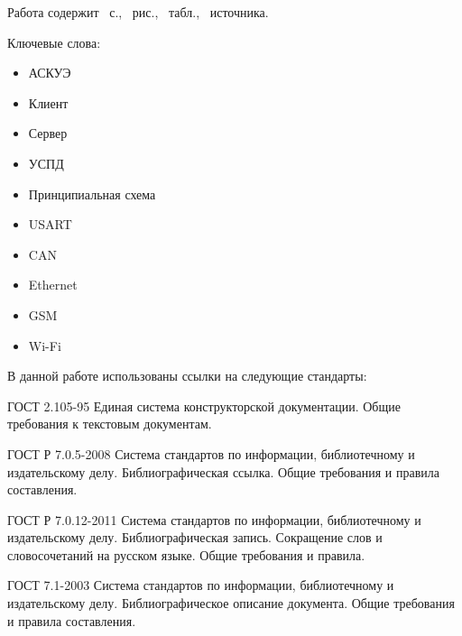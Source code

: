 \documentclass[utf8,14pt, coursreport]{G7-32}
\begin{document}

\frontmatter %



\Referat %

Работа содержит \totalpages{}~с., \totalfigures{}~рис., \totaltables{}~табл., \totalbibs{}~источника.

Ключевые слова:
\begin{itemize}
\item АСКУЭ
\item Клиент
\item Сервер
\item УСПД
\item Принципиальная схема
\item USART
\item CAN
\item Ethernet
\item GSM
\item Wi-Fi
\end{itemize}

\tableofcontents

\iffalse
\NormRefs

В данной работе использованы ссылки на следующие стандарты:

ГОСТ 2.105-95 Единая система конструкторской документации. Общие требования к текстовым документам.

ГОСТ Р 7.0.5-2008 Система стандартов по информации, библиотечному и издательскому делу. Библиографическая ссылка. Общие требования и правила составления.

ГОСТ Р 7.0.12-2011 Система стандартов по информации, библиотечному и издательскому делу. Библиографическая запись. Сокращение слов и словосочетаний на русском языке. Общие требования и правила.

ГОСТ 7.1-2003 Система стандартов по информации, библиотечному и издательскому делу. Библиографическое описание документа. Общие требования и правила составления.
\end{document}
